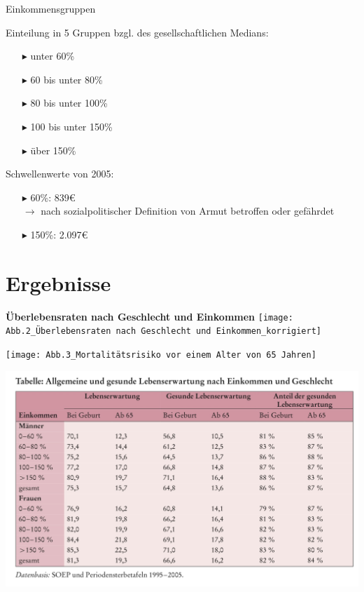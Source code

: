 \documentclass{beamer}
\begin{document}
\begin{frame}{Einkommensgruppen}
	\begin{block}{Einteilung in 5 Gruppen bzgl. des gesellschaftlichen Medians:}
		\begin{itemize}
			\item[$\blacktriangleright$] unter 60\%
			\item[$\blacktriangleright$] 60 bis unter 80\%
			\item[$\blacktriangleright$] 80 bis unter 100\%
			\item[$\blacktriangleright$] 100 bis unter 150\%
			\item[$\blacktriangleright$] über 150\%
		\end{itemize}
	\end{block}
	\begin{block}{Schwellenwerte von 2005:}
		\begin{itemize}
			\item[$\blacktriangleright$] 60\%: 839€ \\ $\rightarrow$ nach sozialpolitischer Definition von Armut betroffen oder gefährdet
			\item[$\blacktriangleright$] 150\%: 2.097€
		\end{itemize}
	\end{block}
\end{frame}



\section{Ergebnisse}
\begin{frame}
\textbf{Überlebensraten nach Geschlecht und Einkommen}
	\texttt{[image: Abb.2\_Überlebensraten nach Geschlecht und Einkommen\_korrigiert]}
\end{frame}

\begin{frame}
	\texttt{[image: Abb.3\_Mortalitätsrisiko vor einem Alter von 65 Jahren]}
\end{frame}

\begin{frame}
	\includegraphics[scale=0.18]{Tabelle_allgemeine und gesunde Lebenserwartung}
\end{frame}
 
\end{document}
